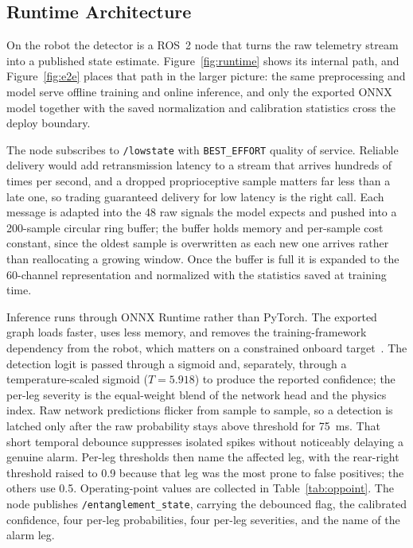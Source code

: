 \subsection{Runtime Architecture}
\label{sec:runtime}

On the robot the detector is a ROS~2 node that turns the raw telemetry stream into a published
state estimate. Figure~\ref{fig:runtime} shows its internal path, and Figure~\ref{fig:e2e} places
that path in the larger picture: the same preprocessing and model serve offline training and online
inference, and only the exported ONNX model together with the saved normalization and calibration
statistics cross the deploy boundary.

The node subscribes to \texttt{/lowstate} with \texttt{BEST\_EFFORT} quality of service. Reliable
delivery would add retransmission latency to a stream that arrives hundreds of times per second, and
a dropped proprioceptive sample matters far less than a late one, so trading guaranteed delivery for
low latency is the right call. Each message is adapted into the 48 raw signals the model expects and
pushed into a 200-sample circular ring buffer; the buffer holds memory and per-sample cost constant,
since the oldest sample is overwritten as each new one arrives rather than reallocating a growing
window. Once the buffer is full it is expanded to the 60-channel representation and normalized with
the statistics saved at training time.

Inference runs through ONNX Runtime rather than PyTorch. The exported graph loads faster, uses less
memory, and removes the training-framework dependency from the robot, which matters on a constrained
onboard target~\cite{onnxruntime,macenski2022ros2}. The detection logit is passed through a sigmoid
and, separately, through a temperature-scaled sigmoid ($T=5.918$) to produce the reported confidence;
the per-leg severity is the equal-weight blend of the network head and the physics index. Raw network
predictions flicker from sample to sample, so a detection is latched only after the raw probability
stays above threshold for 75~ms. That short temporal debounce suppresses isolated spikes without
noticeably delaying a genuine alarm. Per-leg thresholds then name the affected leg, with the
rear-right threshold raised to 0.9 because that leg was the most prone to false positives; the others
use 0.5. Operating-point values are collected in Table~\ref{tab:oppoint}. The node publishes
\texttt{/entanglement\_state}, carrying the debounced flag, the calibrated confidence, four per-leg
probabilities, four per-leg severities, and the name of the alarm leg.

